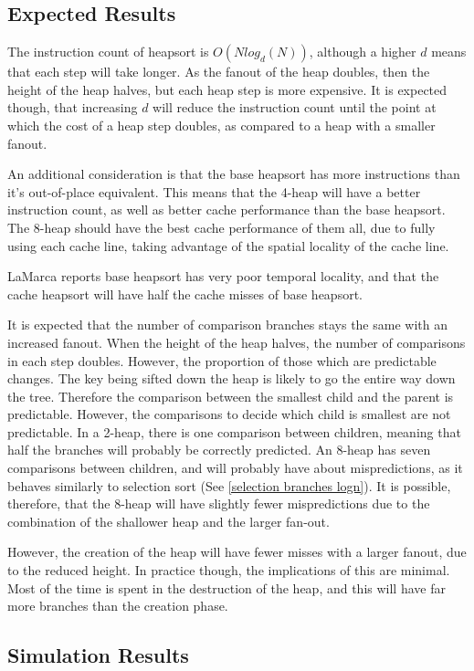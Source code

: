 \subsection{Expected Results}
The instruction count of heapsort is $O(Nlog_d(N))$, although a higher $d$ means
that each step will take longer. As the fanout of the heap doubles, then the
height of the heap halves, but each heap step is more expensive. It is expected
though, that increasing $d$ will reduce the instruction count until the point at
which the cost of a heap step doubles, as compared to a heap with a smaller
fanout.

An additional consideration is that the base heapsort has more instructions than
it's out-of-place equivalent. This means that the 4-heap will have a better
instruction count, as well as better cache performance than the base heapsort.
The 8-heap should have the best cache performance of them all, due to fully
using each cache line, taking advantage of the spatial locality of the cache
line.

LaMarca reports base heapsort has very poor temporal locality, and that the
cache heapsort will have half the cache misses of base heapsort.

It is expected that the number of comparison branches stays the same with
an increased fanout. When the height of the heap halves, the number of
comparisons in each step doubles. However, the proportion of those which are
predictable changes. The key being sifted down the heap is likely to go the
entire way down the tree. Therefore the comparison between the smallest child
and the parent is predictable. However, the comparisons to decide which child is
smallest are not predictable. In a 2-heap, there is one comparison between
children, meaning that half the branches will probably be correctly predicted.
An 8-heap has seven comparisons between children, and will probably have about
mispredictions, as it behaves similarly to selection sort (See \ref{selection
branches logn}). It is possible, therefore, that the 8-heap will have slightly
fewer mispredictions due to the combination of the shallower heap and the larger
fan-out.

However, the creation of the heap will have fewer misses with a larger fanout,
due to the reduced height. In practice though, the implications of this are
minimal. Most of the time is spent in the destruction of the heap, and this will
have far more branches than the creation phase.

\subsection{Simulation Results}


